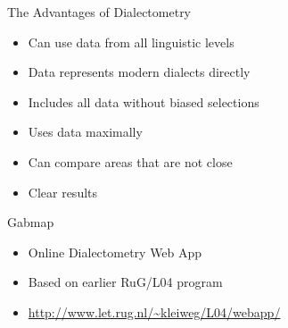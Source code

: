 \documentclass[presentation]{beamer}
\begin{document}
\begin{frame}[label={sec:org394d849}]{The Advantages of Dialectometry}
\begin{itemize}
\item Can use data from all linguistic levels
\item Data represents modern dialects directly
\item Includes all data without biased selections
\item Uses data maximally
\item Can compare areas that are not close
\item Clear results
\end{itemize}
\end{frame}
\begin{frame}[label={sec:org595a31a}]{Gabmap}
\textcite{nerbonne2011gabmapaweb}
\begin{itemize}
\item Online Dialectometry Web App
\item Based on earlier RuG/L04 program
\item \url{http://www.let.rug.nl/\~kleiweg/L04/webapp/}
\end{itemize}
\end{frame}
\end{document}
